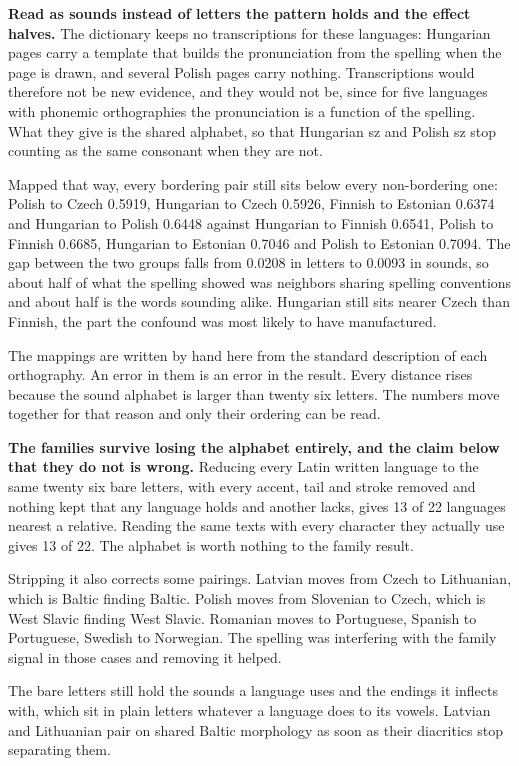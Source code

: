 \textbf{Read as sounds instead of letters the pattern holds and the effect halves.} The dictionary keeps no transcriptions for these languages: Hungarian pages carry a template that builds the pronunciation from the spelling when the page is drawn, and several Polish pages carry nothing. Transcriptions would therefore not be new evidence, and they would not be, since for five languages with phonemic orthographies the pronunciation is a function of the spelling. What they give is the shared alphabet, so that Hungarian sz and Polish sz stop counting as the same consonant when they are not.

Mapped that way, every bordering pair still sits below every non-bordering one: Polish to Czech 0.5919, Hungarian to Czech 0.5926, Finnish to Estonian 0.6374 and Hungarian to Polish 0.6448 against Hungarian to Finnish 0.6541, Polish to Finnish 0.6685, Hungarian to Estonian 0.7046 and Polish to Estonian 0.7094. The gap between the two groups falls from 0.0208 in letters to 0.0093 in sounds, so about half of what the spelling showed was neighbors sharing spelling conventions and about half is the words sounding alike. Hungarian still sits nearer Czech than Finnish, the part the confound was most likely to have manufactured.

The mappings are written by hand here from the standard description of each orthography. An error in them is an error in the result. Every distance rises because the sound alphabet is larger than twenty six letters. The numbers move together for that reason and only their ordering can be read.

\textbf{The families survive losing the alphabet entirely, and the claim below that they do not is wrong.} Reducing every Latin written language to the same twenty six bare letters, with every accent, tail and stroke removed and nothing kept that any language holds and another lacks, gives 13 of 22 languages nearest a relative. Reading the same texts with every character they actually use gives 13 of 22. The alphabet is worth nothing to the family result.

Stripping it also corrects some pairings. Latvian moves from Czech to Lithuanian, which is Baltic finding Baltic. Polish moves from Slovenian to Czech, which is West Slavic finding West Slavic. Romanian moves to Portuguese, Spanish to Portuguese, Swedish to Norwegian. The spelling was interfering with the family signal in those cases and removing it helped.

The bare letters still hold the sounds a language uses and the endings it inflects with, which sit in plain letters whatever a language does to its vowels. Latvian and Lithuanian pair on shared Baltic morphology as soon as their diacritics stop separating them.

